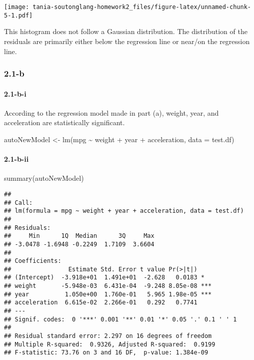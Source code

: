\documentclass[
]{article}
\newenvironment{Shaded}{\begin{snugshade}}{\end{snugshade}}
\newcommand{\AttributeTok}[1]{\textcolor[rgb]{0.77,0.63,0.00}{#1}}
\newcommand{\FunctionTok}[1]{\textcolor[rgb]{0.00,0.00,0.00}{#1}}
\newcommand{\NormalTok}[1]{#1}
\newcommand{\OtherTok}[1]{\textcolor[rgb]{0.56,0.35,0.01}{#1}}
\newcommand{\SpecialCharTok}[1]{\textcolor[rgb]{0.00,0.00,0.00}{#1}}
\begin{document}
\texttt{[image: tania-soutonglang-homework2\_files/figure-latex/unnamed-chunk-5-1.pdf]}

This histogram does not follow a Gaussian distribution. The distribution
of the residuals are primarily either below the regression line or
near/on the regression line.

\hypertarget{b}{%
\subsubsection{2.1-b}\label{b}}

\hypertarget{b-i}{%
\paragraph{2.1-b-i}\label{b-i}}

According to the regression model made in part (a), weight, year, and
acceleration are statistically significant.

\begin{Shaded}
\begin{Highlighting}[]
\NormalTok{autoNewModel }\OtherTok{\textless{}{-}} \FunctionTok{lm}\NormalTok{(mpg }\SpecialCharTok{\textasciitilde{}}\NormalTok{ weight }\SpecialCharTok{+}\NormalTok{ year }\SpecialCharTok{+}\NormalTok{ acceleration, }\AttributeTok{data =}\NormalTok{ test.df)}
\end{Highlighting}
\end{Shaded}

\hypertarget{b-ii}{%
\paragraph{2.1-b-ii}\label{b-ii}}

\begin{Shaded}
\begin{Highlighting}[]
\FunctionTok{summary}\NormalTok{(autoNewModel)}
\end{Highlighting}
\end{Shaded}

\begin{verbatim}
## 
## Call:
## lm(formula = mpg ~ weight + year + acceleration, data = test.df)
## 
## Residuals:
##     Min      1Q  Median      3Q     Max 
## -3.0478 -1.6948 -0.2249  1.7109  3.6604 
## 
## Coefficients:
##                Estimate Std. Error t value Pr(>|t|)    
## (Intercept)  -3.918e+01  1.491e+01  -2.628   0.0183 *  
## weight       -5.948e-03  6.431e-04  -9.248 8.05e-08 ***
## year          1.050e+00  1.760e-01   5.965 1.98e-05 ***
## acceleration  6.615e-02  2.266e-01   0.292   0.7741    
## ---
## Signif. codes:  0 '***' 0.001 '**' 0.01 '*' 0.05 '.' 0.1 ' ' 1
## 
## Residual standard error: 2.297 on 16 degrees of freedom
## Multiple R-squared:  0.9326, Adjusted R-squared:  0.9199 
## F-statistic: 73.76 on 3 and 16 DF,  p-value: 1.384e-09
\end{verbatim}
\end{document}
